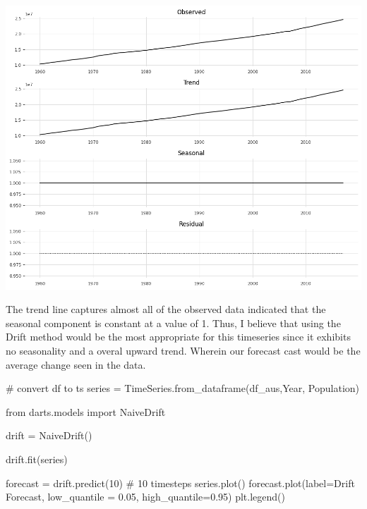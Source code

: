 \documentclass[
  11pt,
]{article}
\newenvironment{Shaded}{\begin{snugshade}}{\end{snugshade}}
\newcommand{\CommentTok}[1]{\textcolor[rgb]{0.37,0.37,0.37}{#1}}
\newcommand{\DecValTok}[1]{\textcolor[rgb]{0.68,0.00,0.00}{#1}}
\newcommand{\FloatTok}[1]{\textcolor[rgb]{0.68,0.00,0.00}{#1}}
\newcommand{\ImportTok}[1]{\textcolor[rgb]{0.00,0.46,0.62}{#1}}
\newcommand{\NormalTok}[1]{\textcolor[rgb]{0.00,0.23,0.31}{#1}}
\newcommand{\OperatorTok}[1]{\textcolor[rgb]{0.37,0.37,0.37}{#1}}
\newcommand{\StringTok}[1]{\textcolor[rgb]{0.13,0.47,0.30}{#1}}
\begin{document}
\includegraphics{hw3_files/figure-pdf/cell-7-output-1.png}

The trend line captures almost all of the observed data indicated that
the seasonal component is constant at a value of 1. Thus, I believe that
using the Drift method would be the most appropriate for this timeseries
since it exhibits no seasonality and a overal upward trend. Wherein our
forecast cast would be the average change seen in the data.

\begin{Shaded}
\begin{Highlighting}[]
\CommentTok{\# convert df to ts }
\NormalTok{series }\OperatorTok{=}\NormalTok{ TimeSeries.from\_dataframe(df\_aus,}\StringTok{\textquotesingle{}Year\textquotesingle{}}\NormalTok{, }\StringTok{\textquotesingle{}Population\textquotesingle{}}\NormalTok{)}
\end{Highlighting}
\end{Shaded}

\begin{Shaded}
\begin{Highlighting}[]
\ImportTok{from}\NormalTok{ darts.models }\ImportTok{import}\NormalTok{ NaiveDrift}

\NormalTok{drift }\OperatorTok{=}\NormalTok{ NaiveDrift()}

\NormalTok{drift.fit(series)}

\NormalTok{forecast }\OperatorTok{=}\NormalTok{ drift.predict(}\DecValTok{10}\NormalTok{) }\CommentTok{\# 10 timesteps}
\NormalTok{series.plot()}
\NormalTok{forecast.plot(label}\OperatorTok{=}\StringTok{\textquotesingle{}Drift Forecast\textquotesingle{}}\NormalTok{, low\_quantile }\OperatorTok{=} \FloatTok{0.05}\NormalTok{, high\_quantile}\OperatorTok{=}\FloatTok{0.95}\NormalTok{)}
\NormalTok{plt.legend()}
\end{Highlighting}
\end{Shaded}
\end{document}
